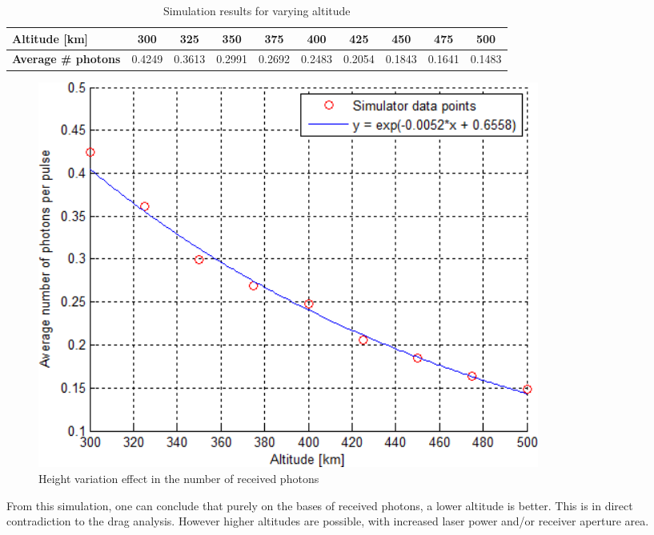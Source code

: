 \small
\begin{table}[ht!]
\begin{tabular}{| l | c | c | c | c | c | c | c |c | c |}

		\textbf{Altitude [km]} &        300 &     325 &      350 &      375 &     400 &     425 &     450 &     475 &      500 \\
	\hline
		\textbf{Average \# photons }&  0.4249 &  0.3613 &   0.2991 &   0.2692 &  0.2483 &  0.2054 &  0.1843 &  0.1641 &   0.1483 \\

\end{tabular}
\caption{Simulation results for varying altitude}
\label{table:simulationHeight}
\end{table} 

\begin{figure}[ht!]
	\centering
		\includegraphics[width=0.8\textwidth]{chapters/img/simulationHeight.png}
	
	\caption{Height variation effect in the number of received photons}
	\label{fig:simulationHeight}
\end{figure}

From this simulation, one can conclude that purely on the bases of received photons, a lower altitude is better. This is in direct contradiction to the drag analysis. However higher altitudes are possible, with increased \ac{laser} power and/or receiver aperture area.